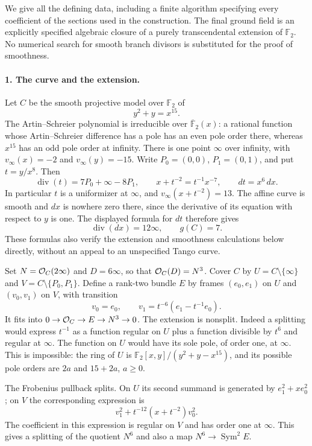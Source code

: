 We give all the defining data, including a finite algorithm specifying
every coefficient of the sections used in the construction. The final
ground field is an explicitly specified algebraic closure of a purely
transcendental extension of $\mathbb F_2$. No numerical search for smooth
branch divisors is substituted for the proof of smoothness.

\paragraph{1. The curve and the extension.}
Let $C$ be the smooth projective model over $\mathbb F_2$ of
\[
 y^2+y=x^{15}.
\]
The Artin--Schreier polynomial is irreducible over
$\overline{\mathbb F}_2(x)$: a rational function whose Artin--Schreier
difference has a pole has an even pole order there, whereas $x^{15}$
has an odd pole order at infinity. There is one point $\infty$ over
infinity, with $v_\infty(x)=-2$ and $v_\infty(y)=-15$.
Write $P_0=(0,0)$, $P_1=(0,1)$, and put $t=y/x^8$. Then
\[
 \operatorname{div}(t)=7P_0+\infty-8P_1,\qquad
 x+t^{-2}=t^{-1}x^{-7},\qquad dt=x^6\,dx.
\]
In particular $t$ is a uniformizer at $\infty$, and
$v_\infty(x+t^{-2})=13$. The affine curve is smooth and $dx$ is
nowhere zero there, since the derivative of its equation with respect
to $y$ is one. The displayed formula for $dt$ therefore gives
\[
 \operatorname{div}(dx)=12\infty,\qquad g(C)=7.
\]
These formulas also verify the extension and smoothness calculations
below directly, without an appeal to an unspecified Tango curve.

Set $N=\mathcal O_C(2\infty)$ and $D=6\infty$, so that
$\mathcal O_C(D)=N^3$. Cover $C$ by
$U=C\setminus\{\infty\}$ and $V=C\setminus\{P_0,P_1\}$.
Define a rank-two bundle $E$ by frames $(e_0,e_1)$ on $U$ and
$(v_0,v_1)$ on $V$, with transition
\begin{equation}\label{a:explicit-transition}
 v_0=e_0,\qquad v_1=t^{-6}(e_1-t^{-1}e_0).
\end{equation}
It fits into $0\to\mathcal O_C\to E\to N^3\to0$.
The extension is nonsplit. Indeed a splitting would express $t^{-1}$
as a function regular on $U$ plus a function divisible by $t^6$ and
regular at $\infty$. The function on $U$ would have its sole pole,
of order one, at $\infty$. This is impossible: the ring of $U$ is
$\mathbb F_2[x,y]/(y^2+y-x^{15})$, and its possible pole orders are
$2a$ and $15+2a$, $a\geq0$.

The Frobenius pullback splits. On $U$ its second summand is generated
by $e_1^2+xe_0^2$; on $V$ the corresponding expression is
\[
 v_1^2+t^{-12}(x+t^{-2})v_0^2.
\]
The coefficient in this expression is regular on $V$ and has order
one at $\infty$. This gives a splitting of the quotient $N^6$ and
also a map $N^6\to\operatorname{Sym}^2E$.

